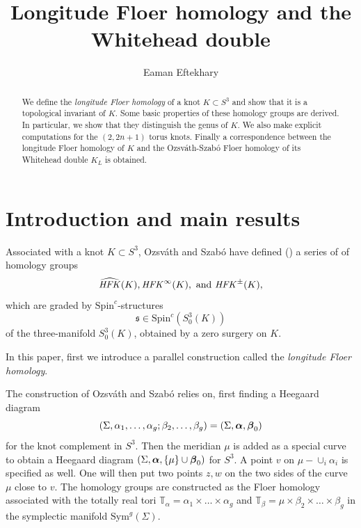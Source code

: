 \documentclass{gtart_h}
\title{Longitude Floer homology and the\\Whitehead double}
\author{Eaman Eftekhary}
\theoremstyle{definition}
\newcommand{\spinc}{\mathfrak s}
\newcommand\alphas{\mbox{\boldmath$\alpha$}}
\newcommand\betas{\mbox{\boldmath$\beta$}}
\newcommand\HFK{\text{\it HFK\/}}
\newcommand{\SpinC}{{\mathrm{Spin}}^c}
\newcommand\Sym{\mathrm{Sym}}
\begin{document}
\begin{abstract}
We define the \emph{longitude Floer homology} of a knot $K\subset
S^3$ and show that it is a topological invariant of $K$. Some
basic properties of these homology groups are derived. In
particular, we show that they distinguish the genus of $K$. We
also make explicit computations for  the $(2,2n+1)$ torus knots.
Finally a correspondence between the longitude Floer homology of
$K$ and the Ozsv\'ath-Szab\'o Floer homology of its Whitehead
double $K_L$ is obtained.
\end{abstract}


\maketitle


\section{Introduction and main results}
Associated with a knot $K\subset S^3$, Ozsv\'ath and Szab\'o have
defined (\cite{OS-knot}) a series of of homology groups
$$\widehat{\HFK}(K), \HFK^\infty(K),\ \text{and} \  \HFK^\pm(K),$$
which are graded by $\SpinC$-structures $$\spinc \in
\SpinC(S^3_0(K))$$
 of the three-manifold $S^3_0(K)$, obtained by a zero surgery on
 $K$.

In this paper, first we introduce a parallel construction called the
\emph{longitude Floer homology}.


The construction of Ozsv\'ath and Szab\'o
 relies on, first finding a Heegaard diagram $$(\Sigma,\alpha_1,\ldots,\alpha_g;
\beta_2,\ldots,\beta_g)=(\Sigma,\alphas,\betas_0)$$ for the knot complement in $S^3$.
Then the meridian $\mu$ is
added as a special curve to obtain a Heegaard diagram $(\Sigma,\alphas,\{\mu\}\cup \betas_0)$
for $S^3$. A point $v$ on $\mu -\cup_i \alpha_i$
is specified as well. One will then put two points $z,w$ on the two sides of the curve
$\mu$ close to $v$. The  homology groups are  constructed as the Floer homology
associated with the totally real tori $\mathbb{T}_\alpha=\alpha_1 \times \ldots\times \alpha_g$
and $\mathbb{T}_\beta=\mu \times \beta_2 \times \ldots\times \beta_g$
in the symplectic manifold
$\Sym^g(\Sigma)$.
\end{document}

